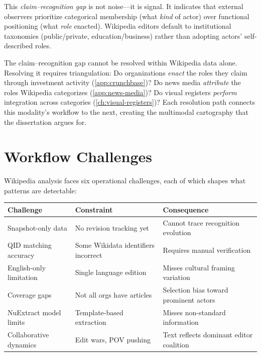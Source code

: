 \documentclass[../main.tex]{subfiles}
\begin{document}
This \emph{claim--recognition gap} is not noise---it is signal.
It indicates that external observers prioritize categorical
membership (what \emph{kind} of actor) over functional positioning
(what \emph{role} enacted).
Wikipedia editors default to institutional taxonomies (public/private,
education/business) rather than adopting actors' self-described roles.

\begin{criticalbox}
The claim--recognition gap cannot be resolved within Wikipedia data alone.
Resolving it requires triangulation:
Do organizations \emph{enact} the roles they claim through investment
activity (\cref{app:crunchbase})?
Do news media \emph{attribute} the roles Wikipedia categorizes
(\cref{app:news-media})?
Do visual registers \emph{perform} integration across categories
(\cref{ch:visual-registers})?
Each resolution path connects this modality's workflow to the next,
creating the multimodal cartography that the dissertation argues for.
\end{criticalbox}


\section{Workflow Challenges}
\label{sec:wikipedia-challenges}

Wikipedia analysis faces six operational challenges,
each of which shapes what patterns are detectable:

\tableminimal
\begin{center}
\begin{tabular}{@{}p{3cm}p{4.5cm}p{4cm}@{}}
\toprule
\textbf{Challenge} & \textbf{Constraint} & \textbf{Consequence} \\
\midrule
Snapshot-only data & No revision tracking yet & Cannot trace recognition evolution \\
QID matching accuracy & Some Wikidata identifiers incorrect & Requires manual verification \\
English-only limitation & Single language edition & Misses cultural framing variation \\
Coverage gaps & Not all orgs have articles & Selection bias toward prominent actors \\
NuExtract model limits & Template-based extraction & Misses non-standard information \\
Collaborative dynamics & Edit wars, POV pushing & Text reflects dominant editor coalition \\
\bottomrule
\end{tabular}
\end{center}
\end{document}
